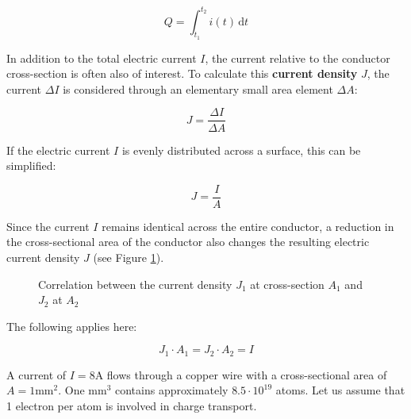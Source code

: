 {\begin{equation}
	Q = \int_{t_1}^{t_2} i(t) \, \mathrm{d} t	
\end{equation}

In addition to the total electric current $I$, the current relative to the conductor cross-section is often also of interest.
To calculate this \textbf{current density} $J$, the current $\Delta I$ is considered through an elementary small area element $\Delta A$: 

\begin{equation}
	J = \frac{\Delta I}{\Delta A}
\end{equation}

If the electric current $I$ is evenly distributed across a surface, this can be simplified:

\begin{equation}
	J = \frac{I}{A}
\end{equation}

Since the current $I$ remains identical across the entire conductor, a 
reduction in the cross-sectional area of the conductor also changes the resulting electric current density $J$ (see Figure \ref{fig:stromdichte}).

\begin{figure}[h!]
	\renewcommand{\figurename}{Figure}
	\centering
	
	\caption{Correlation between the current density $J_1$ at cross-section $A_1$ and $J_2$ at $A_2$}
	\label{fig:stromdichte}
\end{figure}

The following applies here:

\begin{equation*}
	J_1 \cdot A_1 = J_2 \cdot A_2 = I
\end{equation*}





\begin{expl}{}{}

	A current of $I = 8 \mathrm{A}$ flows through a copper wire with a cross-sectional area of $A = 1 \mathrm{mm}^2$.
	One $\mathrm{mm}^3$ contains approximately $ 8.5 \cdot 10^{19}$ atoms. Let us assume that 1 electron per atom is involved in charge transport.

	\begin{center}
		
	\end{center}
	


\end{expl}}
